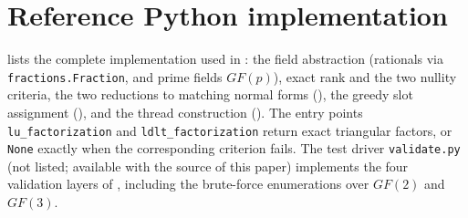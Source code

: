 \section{Reference Python implementation}\label{sec:appendix-code}

 lists the complete implementation used in
: the field abstraction (rationals via
\texttt{fractions.Fraction}, and prime fields $GF(p)$), exact rank and the
two nullity criteria, the two reductions to matching normal forms
(), the greedy slot assignment
(), and the thread construction
().  The entry points
\texttt{lu\_factorization} and \texttt{ldlt\_factorization} return exact
triangular factors, or \texttt{None} exactly when the corresponding
criterion fails.  The test driver \texttt{validate.py} (not listed;
available with the source of this paper) implements the four validation
layers of , including the brute-force enumerations
over $GF(2)$ and $GF(3)$.


